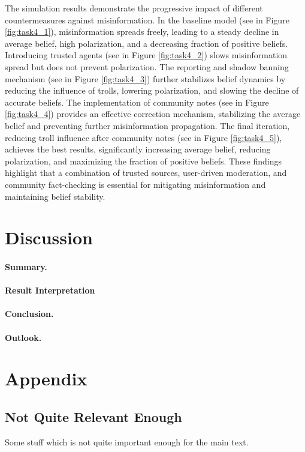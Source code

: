 \documentclass[a4paper,11pt]{scrartcl}
\begin{document}
The simulation results demonstrate the progressive impact of different countermeasures against misinformation. In the baseline model (see in Figure \ref{fig:task4_1}), misinformation spreads freely, leading to a steady decline in average belief, high polarization, and a decreasing fraction of positive beliefs. Introducing trusted agents (see in Figure \ref{fig:task4_2}) slows misinformation spread but does not prevent polarization. The reporting and shadow banning mechanism (see in Figure \ref{fig:task4_3}) further stabilizes belief dynamics by reducing the influence of trolls, lowering polarization, and slowing the decline of accurate beliefs. The implementation of community notes (see in Figure \ref{fig:task4_4}) provides an effective correction mechanism, stabilizing the average belief and preventing further misinformation propagation. The final iteration, reducing troll influence after community notes (see in Figure \ref{fig:task4_5}), achieves the best results, significantly increasing average belief, reducing polarization, and maximizing the fraction of positive beliefs. These findings highlight that a combination of trusted sources, user-driven moderation, and community fact-checking is essential for mitigating misinformation and maintaining belief stability.

\newpage
\section{Discussion}
\paragraph{Summary.}
\paragraph{Result Interpretation}
\paragraph{Conclusion.} 
\paragraph{Outlook.} 
\newpage




\appendix
\section{Appendix}
\subsection{Not Quite Relevant Enough}
Some stuff which is not quite important enough for the main text.
\end{document}

